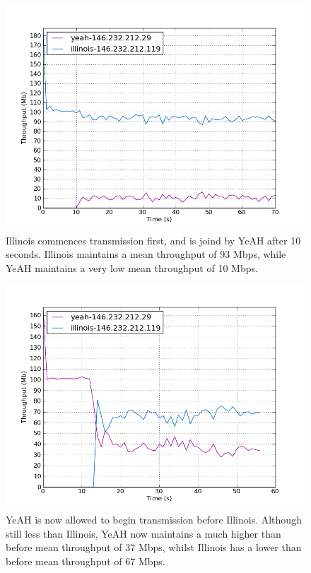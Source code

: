 \documentclass[11pt,a4paper,twocolumn]{article}
\begin{document}
\label{subsec:}
\begin{figure}[p]
	\includegraphics[width=\linewidth]{exp29.png}
	\caption{Illinois commences transmission first, and is joind by YeAH after 10 seconds. Illinois maintains
		a mean throughput of 93 Mbps, while YeAH maintains a very low mean throughput of 10 Mbps.}
	\label{fig:illinois_yeah}
\end{figure}

\begin{figure}[p]
	\includegraphics[width=\linewidth]{exp29b.png}
	\caption{YeAH is now allowed to begin transmission before Illinois. Although still less than Illinois,
		YeAH now maintains a much higher than before mean throughput of 37 Mbps, whilst Illinois has
		a lower than before mean throughput of 67 Mbps.}
	\label{fig:yeah_illinois}
\end{figure}
\end{document}
